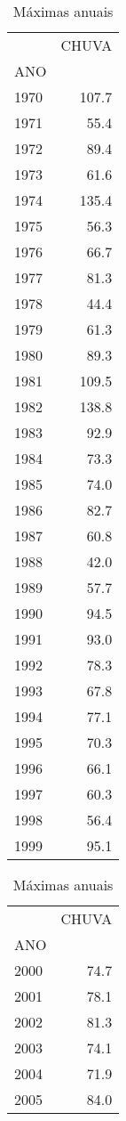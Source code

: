   
    \begin{table}[H]
    \centering
    \caption{Máximas anuais}
    {
    	\begin{tabular}[t]{lr}
\toprule
{} &  CHUVA \\
ANO  &        \\
\midrule
1970 &  107.7 \\
1971 &   55.4 \\
1972 &   89.4 \\
1973 &   61.6 \\
1974 &  135.4 \\
1975 &   56.3 \\
1976 &   66.7 \\
1977 &   81.3 \\
1978 &   44.4 \\
1979 &   61.3 \\
1980 &   89.3 \\
1981 &  109.5 \\
1982 &  138.8 \\
1983 &   92.9 \\
1984 &   73.3 \\
1985 &   74.0 \\
1986 &   82.7 \\
1987 &   60.8 \\
1988 &   42.0 \\
1989 &   57.7 \\
1990 &   94.5 \\
1991 &   93.0 \\
1992 &   78.3 \\
1993 &   67.8 \\
1994 &   77.1 \\
1995 &   70.3 \\
1996 &   66.1 \\
1997 &   60.3 \\
1998 &   56.4 \\
1999 &   95.1 \\
\end{tabular}
\begin{tabular}[t]{lr}
	\toprule
	{} &  CHUVA \\
	ANO  &        \\
	\midrule
2000 &   74.7 \\
2001 &   78.1 \\
2002 &   81.3 \\
2003 &   74.1 \\
2004 &   71.9 \\
2005 &   84.0 \\

\end{tabular}}
\end{table}
